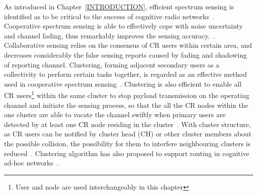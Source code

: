 As introduced in Chapter~\ref{INTRODUCTION}, efficient spectrum sensing is identified as to be critical to the success of cognitive radio networks~\cite{Sahai_FundamentalDesignTradeoffs2006}.
Cooperative spectrum sensing is able to effectively cope with noise uncertainty and channel fading, thus remarkably improves the sensing accuracy.~\cite{coorperativeSensing_Akyildiz11}.
Collaborative sensing relies on the consensus of CR users within certain area, and decreases considerably the false sensing reports caused by fading and shadowing of reporting channel.
Clustering, \ie forming adjacent secondary users as a collectivity to perform certain tasks together, is regarded as an effective method used in cooperative spectrum sensing~\cite{Sun07_clustering_spectrum_secsing, Zhao07}.
Clustering is also efficient to enable all CR users\footnote{User and node are used interchangeably in this chapter} within the same cluster to stop payload transmission on the operating channel and initiate the sensing process, so that the all the CR nodes within the one cluster are able to vacate the channel swiftly when primary users are detected by at least one CR node residing in the cluster~\cite{willkomm08}.
With cluster structure, as CR users can be notified by cluster head (\gls{CH}) or other cluster members about the possible collision, the possibility for them to interfere neighbouring clusters is reduced~\cite{centralizedSharing80222}. 
Clustering algorithm has also proposed to support routing in cognitive ad-hoc networks~\cite{Abbasi_survey_07}.


